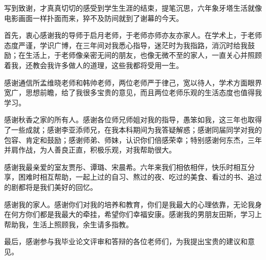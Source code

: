 

写到致谢，才真真切切的感受到学生生涯的结束，提笔沉思，六年象牙塔生活就像电影画面一样扑面而来，猝不及防间就到了谢幕的今天。

首先，衷心感谢我的导师于启月老师，于老师亦师亦友亦家人。在学术上，于老师态度严谨，学识广博，在三年间对我悉心指导，迷茫时为我指路，消沉时给我鼓励；在生活上，于老师像亲密无间的朋友，也像无微不至的家人，一直关心并照顾着我，还教会我许多做人的道理，这些我都将受用一生。

感谢通信所孟维晓老师和韩帅老师，两位老师严于律己，宽以待人，学术方面眼界宽广，思想前瞻，给了我很多宝贵的意见，而且两位老师乐观的生活态度也值得我学习。

感谢秋香之家的所有人。感谢各位师兄师姐对我的指导，愚笨如我，这三年也取得了一些成就；感谢李亚添师兄，在我本科期间为我答疑解惑；感谢同届同学对我的包容、肯定和鼓励；感谢师弟、师妹，认识你们倍感荣幸；特别感谢何东杰，三年并肩作战，为人善良正直，积极乐观，对我帮助很大。

感谢我最亲爱的室友贾彤、谭璐、宋晨希。六年来我们相依相伴，快乐时相互分享，困难时相互帮助，一起上过的自习、熬过的夜、吃过的美食、看过的书、追过的剧都将是我们美好的回忆。

感谢我的家人。感谢你们对我的培养和教育，你们是我最大的心理依靠，无论我身在何方你们都是我最大的牵挂，希望你们幸福安康。感谢我的男朋友田斯，学习上帮助我，生活上照顾我，余生请多指教。

最后，感谢参与我毕业论文评审和答辩的各位老师们，为我提出宝贵的建议和意见。
